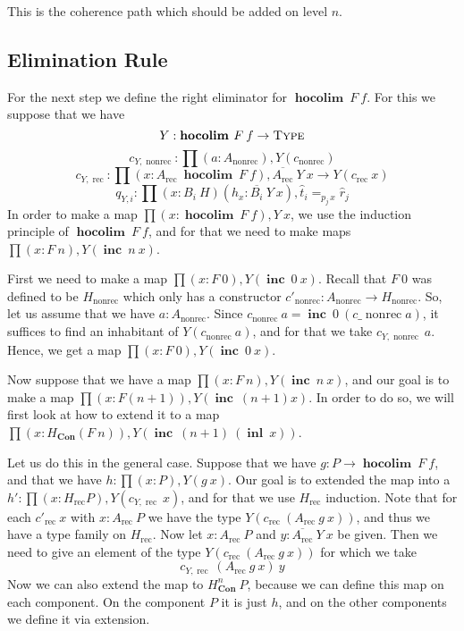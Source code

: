 \documentclass[a4paper,UKenglish]{lipics-v2016}
\newcommand{\rec}[0]{\operatorname{rec}}
\newcommand{\nonrec}[0]{\operatorname{nonrec}}
\newcommand{\Con}[0]{\textbf{Con}}
\newcommand{\hocolim}[0]{\operatorname{\textbf{hocolim}}}
\newcommand{\inl}[0]{\operatorname{\textbf{inl}}}
\newcommand{\inc}[0]{\operatorname{\textbf{inc}}}
\newcommand{\Type}[0]{\operatorname{\textsc{Type}}}
\newcommand{\dak}[1]{\widehat{#1}}
\newcommand{\hatt}{\dak{t}}
\newcommand{\hatr}{\dak{r}}
\begin{document}
This is the coherence path which should be added on level $n$.


\subsection{Elimination Rule}
For the next step we define the right eliminator for $\hocolim \> F \> f$. 
For this we suppose that we have
\[
Y : \hocolim \> F \> f \rightarrow \Type
\]
\[
c_{Y, \nonrec} : \prod (a : A_{\nonrec}), Y(c_{\nonrec})
\]
\[
c_{Y, \rec} : \prod (x : A_{\rec} \> \hocolim \> F \> f), \overline{A_{\rec}} \> Y \> x \rightarrow Y(c_{\rec} \> x)
\]
\[
q_{Y, i} : \prod (x : B_i \> H)(h_x : \overline{B_i} \> Y \> x), \hatt_i =_{p_j \, x} \hatr_j
\]
In order to make a map $\prod (x : \hocolim \> F \> f), Y \> x$, we use the induction principle of $\hocolim \> F \> f$, and for that we need to make maps $\prod (x : F \> n), Y(\inc \> n \> x)$.

First we need to make a map $\prod (x : F \> 0), Y(\inc \> 0 \> x)$.
Recall that $F \> 0$ was defined to be $H_{\nonrec}$ which only has a constructor $c'_{\nonrec} : A_{\nonrec} \rightarrow H_{\nonrec}$.
So, let us assume that we have $a : A_{\nonrec}$.
Since $c_{\nonrec} \> a = \inc \> 0 \> (c\_{\nonrec} a)$, it suffices to find an inhabitant of $Y(c_{\nonrec} \> a)$, and for that we take $c_{Y, \nonrec} \> a$.
Hence, we get a map $\prod (x : F \> 0), Y(\inc \> 0 \> x)$.

Now suppose that we have a map $\prod (x : F \> n), Y(\inc \> n \> x)$, and our goal is to make a map $\prod  (x : F(n+1)), Y(\inc \> (n+1) x)$.
In order to do so, we will first look at how to extend it to a map $\prod (x : H_{\Con} (F \> n)), Y(\inc \> (n+1) \> (\inl \> x))$.

Let us do this in the general case.
Suppose that we have $g : P \rightarrow \hocolim \> F \> f$, and that we have $h : \prod (x : P), Y(g \> x)$.
Our goal is to extended the map into a $h' : \prod (x : H_{\rec} P), Y(c_{Y, \rec} \> x)$, and for that we use $H_{\rec}$ induction.
Note that for each $c'_{\rec} \> x$ with $x : A_{\rec} \> P$ we have the type $Y(c_{\rec} \> (A_{\rec} \> g \> x))$, and thus we have a type family on $H_{\rec}$.
Now let $x : A_{\rec} \> P$ and $y : \overline{A_{\rec}} \> Y \> x$ be given.
Then we need to give an element of the type $Y(c_{\rec} \> (A_{\rec} \> g \> x))$ for which we take
\[
c_{Y,\rec} \> (A_{\rec} \> g \> x) \> y
\]
Now we can also extend the map to $H_{\Con}^n \> P$, because we can define this map on each component.
On the component $P$ it is just $h$, and on the other components we define it via extension.
\end{document}
